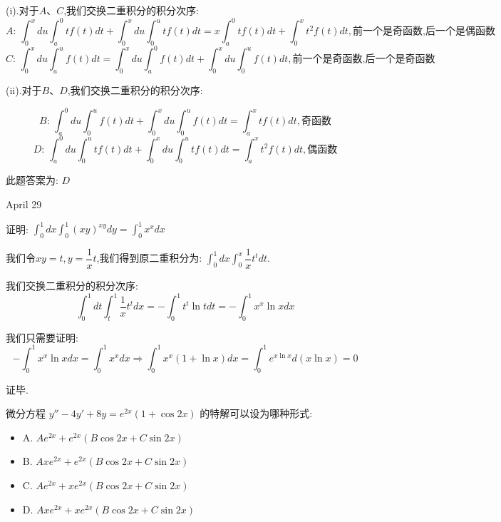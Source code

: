 \begin{solution}
	
	(i).对于$A\text{、}C$,我们交换二重积分的积分次序: 
	$$A\text{: }\int_{0}^{x}du\int_{a}^{0}tf(t)dt+\int_{0}^{x}du\int_{0}^{u}tf(t)dt=x\int_{a}^{0}tf(t)dt+\int_{0}^{x}t^2f(t)dt,\text{前一个是奇函数,后一个是偶函数}$$
	$$C\text{: }\int_{0}^{x}du\int_{a}^{u}f(t)dt=\int_{0}^{x}du\int_{a}^{0}f(t)dt+\int_{0}^{x}du\int_{0}^{u}f(t)dt,\text{前一个是奇函数,后一个是奇函数}$$
	
	(ii).对于$B\text{、}D$,我们交换二重积分的积分次序: 
	
	$$B\text{: }\int_{a}^{0}du\int_{0}^{u}f(t)dt+\int_{0}^{x}du\int_{0}^{u}f(t)dt=\int_{a}^{x}tf(t)dt,\text{奇函数}$$
	$$D\text{: }\int_{a}^{0}du\int_{0}^{u}tf(t)dt+\int_{0}^{x}du\int_{0}^{u}tf(t)dt=\int_{a}^{x}t^2f(t)dt,\text{偶函数}$$
	
	此题答案为: $D$
\end{solution}


\textcolor{purplea}{April 29}

\begin{example}[][Exam: 30.4.15]
	证明: $\int_{0}^{1}dx\int_{0}^{1}(xy)^{xy}dy=\int_{0}^{1}x^{x}dx$
\end{example}
\begin{solution}
	
	我们令$xy=t,y=\dfrac{1}{x}t$,我们得到原二重积分为: $\int_{0}^{1}dx\int_{0}^{x}\dfrac{1}{x}t^{t}dt$.
	
	我们交换二重积分的积分次序: 
	$$\int_{0}^{1}dt\int_{t}^{1}\frac{1}{x}t^{t}dx=-\int_{0}^{1}t^{t}\ln tdt=-\int_{0}^{1}x^{x}\ln xdx$$
	
	我们只需要证明: 
	$$-\int_{0}^{1}x^{x}\ln xdx=\int_{0}^{1}x^{x}dx\Rightarrow\int_{0}^{1}x^{x}(1+\ln x)dx=\int_{0}^{1}e^{x\ln x}d(x\ln x)=0$$
	
	证毕.
\end{solution}

\begin{example}[][Exam: 30.4.16]
	微分方程 $y''-4y'+8y=e^{2x}(1+\cos 2x)$ 的特解可以设为哪种形式: 
\begin{itemize}
	\item A. $Ae^{2x}+e^{2x}(B\cos 2x+C\sin 2x)$ 
	\item B. $Axe^{2x}+e^{2x}(B\cos 2x+C\sin 2x)$ 
	\item C. $Ae^{2x}+xe^{2x}(B\cos 2x+C\sin 2x)$ 
	\item D. $Axe^{2x}+xe^{2x}(B\cos 2x+C\sin 2x)$ 
\end{itemize}
\end{example}

